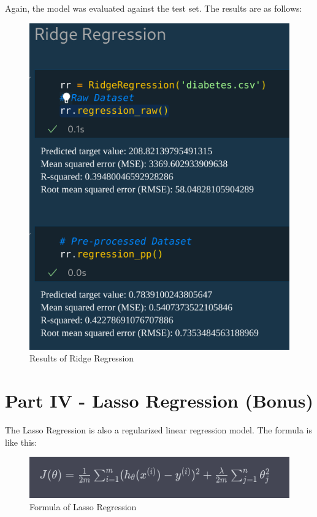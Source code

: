 \documentclass{CPSReport}
\begin{document}
Again, the model was evaluated against the test set. The results are as follows:
\begin{figure}[ht]
    \begin{center}
        \includegraphics[width=1\linewidth]{pics/Result_Ridge.png}
    \end{center}
    \caption{Results of Ridge Regression}
    \label{fig:res_Ridge}
\end{figure}

\section{Part IV - Lasso Regression (Bonus)}
The Lasso Regression is also a regularized linear regression model. The formula is like this:
\begin{figure}[ht]
    \begin{center}
        \includegraphics[width=1\linewidth]{pics/Formula_Lasso.png}
    \end{center}
    \caption{Formula of Lasso Regression}
    \label{fig:form_Lasso}
\end{figure}
\end{document}
